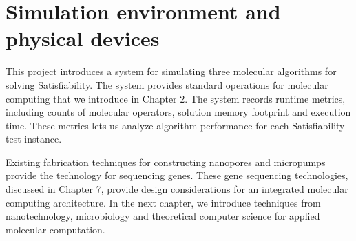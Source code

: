 \section{Simulation environment and physical devices}
	
This project introduces a system for simulating three molecular algorithms for solving {\sc Satisfiability}.  The system provides standard operations for molecular computing that we introduce in Chapter 2.  The system records runtime metrics, including counts of molecular operators, solution memory footprint and execution time.  These metrics lets us analyze algorithm performance for each {\sc Satisfiability} test instance.

Existing fabrication techniques for constructing nanopores \cite{ionTorrent, oxfordNanopore} and micropumps \cite{Liao_Lee_Liu_Hsieh_Luo_2005} provide the technology for sequencing genes.  These gene sequencing technologies, discussed in Chapter 7, provide design considerations for an integrated molecular computing architecture.  In the next chapter, we introduce techniques from nanotechnology, microbiology and theoretical computer science for applied molecular computation.
